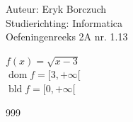 \documentclass[a4paper]{article}
\begin{document}
  
\noindent \large Auteur: Eryk Borczuch \\
\noindent \large Studierichting: Informatica\\
\noindent \large Oefeningenreeks 2A nr. 1.13\\

\medskip

\normalsize

$f(x) = \sqrt{x-3}$\\

$\operatorname{dom} f = [3,+\infty[$\\

$\operatorname{bld} f = [0,+\infty[$\\

\begin{thebibliography}{999}
\end{thebibliography}
\end{document}
